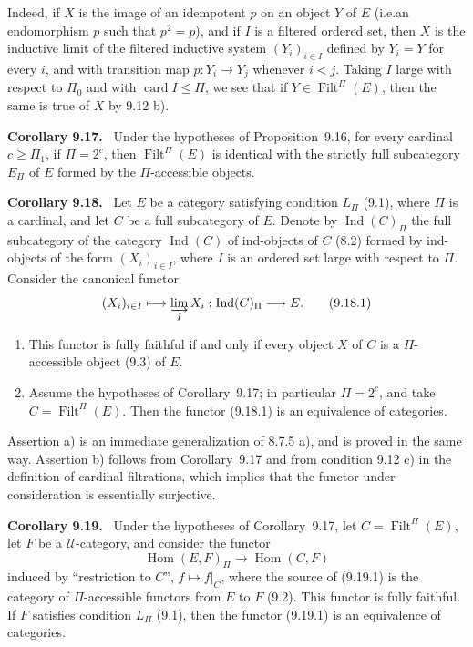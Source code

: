 \documentclass[11pt]{article}
\newcommand{\U}{\mathcal{U}}
\newcommand{\Ind}{\operatorname{Ind}}
\newcommand{\Filt}{\operatorname{Filt}}
\newcommand{\card}{\operatorname{card}}
\newcommand{\Hhom}{\operatorname{Hom}}
\newcommand{\ie}{i.e.}
\newenvironment{statement}[1]{\par\medskip\noindent\textbf{#1.}\ }{\par\medskip}
\begin{document}
Indeed, if $X$ is the image of an idempotent $p$ on an object $Y$ of $E$ (\ie an endomorphism $p$ such that $p^2=p$), and if $I$ is a filtered ordered set, then $X$ is the inductive limit of the filtered inductive system $(Y_i)_{i\in I}$ defined by $Y_i=Y$ for every $i$, and with transition map $p:Y_i\to Y_j$ whenever $i<j$. Taking $I$ large with respect to $\Pi_0$ and with $\card I\leq\Pi$, we see that if $Y\in\Filt^\Pi(E)$, then the same is true of $X$ by 9.12 b).

\begin{statement}{Corollary 9.17}
Under the hypotheses of Proposition~9.16, for every cardinal $c\geq\Pi_1$, if $\Pi=2^c$, then $\Filt^\Pi(E)$ is identical with the strictly full subcategory $E_\Pi$ of $E$ formed by the $\Pi$-accessible objects.
\end{statement}

\begin{statement}{Corollary 9.18}
Let $E$ be a category satisfying condition $L_\Pi$ (9.1), where $\Pi$ is a cardinal, and let $C$ be a full subcategory of $E$. Denote by $\Ind(C)_\Pi$ the full subcategory of the category $\Ind(C)$ of ind-objects of $C$ (8.2) formed by ind-objects of the form $(X_i)_{i\in I}$, where $I$ is an ordered set large with respect to $\Pi$. Consider the canonical functor
\begin{equation}
 (X_i)_{i\in I}\longmapsto \varinjlim_I X_i:\Ind(C)_\Pi\longrightarrow E.
 \tag{9.18.1}
\end{equation}
\begin{enumerate}[label=\alph*)]
\item This functor is fully faithful if and only if every object $X$ of $C$ is a $\Pi$-accessible object (9.3) of $E$.
\item Assume the hypotheses of Corollary~9.17; in particular $\Pi=2^c$, and take $C=\Filt^\Pi(E)$. Then the functor (9.18.1) is an equivalence of categories.
\end{enumerate}
\end{statement}

Assertion a) is an immediate generalization of 8.7.5 a), and is proved in the same way. Assertion b) follows from Corollary~9.17 and from condition 9.12 c) in the definition of cardinal filtrations, which implies that the functor under consideration is essentially surjective.

\begin{statement}{Corollary 9.19}
Under the hypotheses of Corollary~9.17, let $C=\Filt^\Pi(E)$, let $F$ be a $\U$-category, and consider the functor
\begin{equation}
 \Hhom(E,F)_\Pi\longrightarrow \Hhom(C,F)
 \tag{9.19.1}
\end{equation}
induced by ``restriction to $C$'', $f\mapsto f|_C$, where the source of (9.19.1) is the category of $\Pi$-accessible functors from $E$ to $F$ (9.2). This functor is fully faithful. If $F$ satisfies condition $L_\Pi$ (9.1), then the functor (9.19.1) is an equivalence of categories.
\end{statement}
\end{document}

